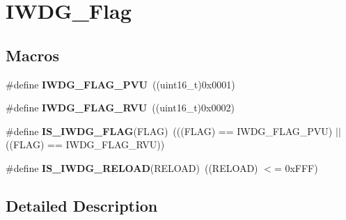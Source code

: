 \hypertarget{group___i_w_d_g___flag}{}\section{I\+W\+D\+G\+\_\+\+Flag}
\label{group___i_w_d_g___flag}
\subsection*{Macros}
\begin{DoxyCompactItemize}
\item 
\hypertarget{group___i_w_d_g___flag_gae20afcf399fad1534e79a8d30ea86c9c}{}\#define {\bfseries I\+W\+D\+G\+\_\+\+F\+L\+A\+G\+\_\+\+P\+V\+U}~((uint16\+\_\+t)0x0001)\label{group___i_w_d_g___flag_gae20afcf399fad1534e79a8d30ea86c9c}

\item 
\hypertarget{group___i_w_d_g___flag_ga3731bf2711c234ffe5b405fb6634ebca}{}\#define {\bfseries I\+W\+D\+G\+\_\+\+F\+L\+A\+G\+\_\+\+R\+V\+U}~((uint16\+\_\+t)0x0002)\label{group___i_w_d_g___flag_ga3731bf2711c234ffe5b405fb6634ebca}

\item 
\hypertarget{group___i_w_d_g___flag_ga5be9ae9ba267cf09a00523ef3e219293}{}\#define {\bfseries I\+S\+\_\+\+I\+W\+D\+G\+\_\+\+F\+L\+A\+G}(F\+L\+A\+G)~(((F\+L\+A\+G) == I\+W\+D\+G\+\_\+\+F\+L\+A\+G\+\_\+\+P\+V\+U) $\vert$$\vert$ ((F\+L\+A\+G) == I\+W\+D\+G\+\_\+\+F\+L\+A\+G\+\_\+\+R\+V\+U))\label{group___i_w_d_g___flag_ga5be9ae9ba267cf09a00523ef3e219293}

\item 
\hypertarget{group___i_w_d_g___flag_ga7c319e96bded8e3c38c6a42a1b335c68}{}\#define {\bfseries I\+S\+\_\+\+I\+W\+D\+G\+\_\+\+R\+E\+L\+O\+A\+D}(R\+E\+L\+O\+A\+D)~((R\+E\+L\+O\+A\+D) $<$= 0x\+F\+F\+F)\label{group___i_w_d_g___flag_ga7c319e96bded8e3c38c6a42a1b335c68}

\end{DoxyCompactItemize}


\subsection{Detailed Description}
